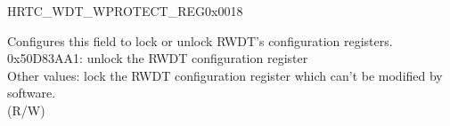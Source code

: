 \begin{register}{H}{RTC\_WDT\_WPROTECT\_REG}{0x0018}\label{regdesc:RTCWDTWPROTECTREG}
%
\regnewline%
\begin{regdesc}\begin{reglist}
\label{fielddesc:RTCWDTWKEY}\item [RTC\_WDT\_WKEY] Configures this field to lock or unlock RWDT's configuration registers.\\
0x50D83AA1: unlock the RWDT configuration register \\
Other values: lock the RWDT configuration register which can't be modified by software.\\
 (R/W)
\end{reglist}\end{regdesc}
\end{register}


